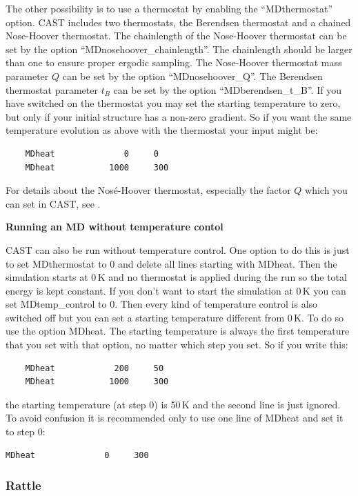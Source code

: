 \documentclass[10pt,a4paper]{article} %
\begin{document}
	The other possibility is to use a thermostat by enabling the ``MDthermostat'' option. CAST includes two thermostats, the Berendsen thermostat and a chained Nose-Hoover thermostat. The chainlength of the Nose-Hoover thermostat can be set by the option ``MDnosehoover\_chainlength''. The chainlength should be larger than one to ensure proper ergodic sampling. The Nose-Hoover thermostat mass parameter $Q$ can be set by the option ``MDnosehoover\_Q''. The Berendsen thermostat parameter $t_B$ can be set by the option ``MDberendsen\_t\_B''. If you have switched on the thermostat you may set the starting temperature to zero, but only if your initial structure has a non-zero gradient. So if you want the same temperature evolution as above with the thermostat your input might be:
		\begin{lstlisting}
	MDheat			    0  	  0
	MDheat 			 1000     300
	\end{lstlisting}
	
	For details about the Nosé-Hoover thermostat, especially the factor $Q$ which you can set in CAST, see \cite{frenkel_understanding_2001}.
	
\textbf{	Running an MD without temperature contol}
	
	\ac{CAST} can also be run without temperature control. One option to do this is just to set MDthermostat to 0 and delete all lines starting with MDheat. Then the simulation starts at 0\,K and no thermostat is applied during the run so the total energy is kept constant. If you don't want to start the simulation at 0\,K you can set MDtemp\_control to 0. Then every kind of temperature control is also switched off but you can set a starting temperature different from 0\,K. To do so use the option MDheat. The starting temperature is always the first temperature that you set with that option, no matter which step you set. So if you write this:
			\begin{lstlisting}
	MDheat			  200  	  50
	MDheat 			 1000     300
	\end{lstlisting}
	the starting temperature (at step 0) is 50\,K and the second line is just ignored. To avoid confusion it is recommended only to use one line of MDheat and set it to step 0:
\begin{lstlisting}
MDheat			    0  	  300
\end{lstlisting}	

\subsubsection{Rattle}
\end{document}
